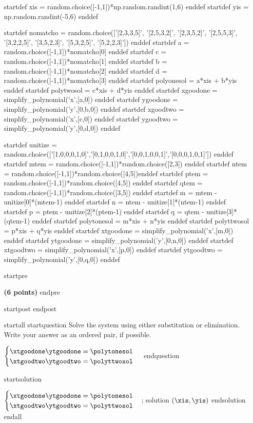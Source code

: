 
startdef xis = random.choice([-1,1])*np.random.randint(1,6) enddef
startdef yis = np.random.randint(-5,6) enddef

startdef nomatcho = random.choice(['[2,3,3,5]', '[2,5,3,2]', '[2,3,5,2]', '[2,5,5,3]', '[3,2,2,5]', '[3,5,2,3]', '[5,3,2,5]', '[5,2,2,3]']) enddef
startdef a = random.choice([-1,1])*nomatcho[0] enddef
startdef c = random.choice([-1,1])*nomatcho[1] enddef
startdef b = random.choice([-1,1])*nomatcho[2] enddef
startdef d = random.choice([-1,1])*nomatcho[3] enddef
startdef polyonesol = a*xis + b*yis enddef
startdef polytwosol = c*xis + d*yis enddef
startdef xgoodone = simplify_polynomial('x',[a,0]) enddef
startdef ygoodone = simplify_polynomial('y',[0,b,0]) enddef
startdef xgoodtwo = simplify_polynomial('x',[c,0]) enddef
startdef ygoodtwo = simplify_polynomial('y',[0,d,0]) enddef


startdef unitize = random.choice(['[1,0,0,0,1,0]','[0,1,0,0,1,0]','[0,0,1,0,0,1]','[0,0,0,1,0,1]']) enddef
startdef mtem = random.choice([-1,1])*random.choice([2,3]) enddef
startdef ntem = random.choice([-1,1])*random.choice([4,5])enddef
startdef ptem = random.choice([-1,1])*random.choice([4,5]) enddef
startdef qtem = random.choice([-1,1])*random.choice([3,5]) enddef
startdef m = mtem - unitize[0]*(mtem-1) enddef
startdef n = ntem - unitize[1]*(ntem-1) enddef
startdef p = ptem - unitize[2]*(ptem-1) enddef
startdef q = qtem - unitize[3]*(qtem-1) enddef
startdef polytonesol = m*xis + n*yis enddef
startdef polyttwosol = p*xis + q*yis enddef
startdef xtgoodone = simplify_polynomial('x',[m,0]) enddef
startdef ytgoodone = simplify_polynomial('y',[0,n,0]) enddef
startdef xtgoodtwo = simplify_polynomial('x',[p,0]) enddef
startdef ytgoodtwo = simplify_polynomial('y',[0,q,0]) enddef





startpre \item {\bf (6 points)} endpre

startpost
 \vfill \vfill
endpost


startall
startquestion Solve the system using either substitution or elimination. Write your answer as an ordered pair, if possible. 

$ \begin{cases} \xtgoodone \ytgoodone = \polytonesol \\
\xtgoodtwo \ytgoodtwo = \polyttwosol
\end{cases}$
endquestion 

startsolution
\item $ \begin{cases} \xtgoodone \ytgoodone = \polytonesol \\
\xtgoodtwo \ytgoodtwo = \polyttwosol
\end{cases}$; solution $(\xis, \yis)$
endsolution
endall




